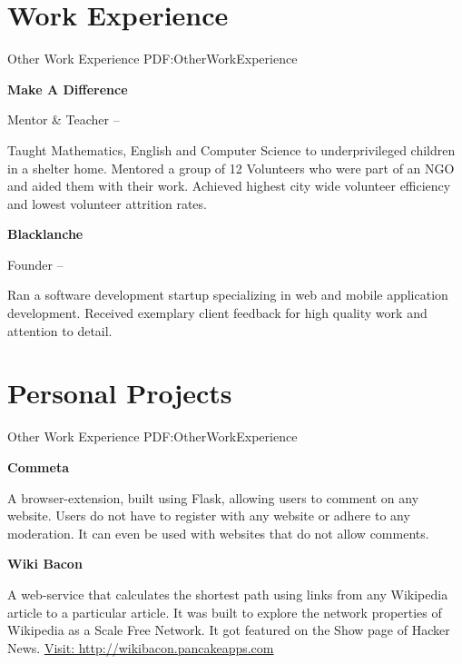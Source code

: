 \documentclass[letterpaper,10pt,oneside]{article}
\begin{document}
\begin{body}

\section
{Work\newline
Experience}
{Other Work Experience}
{PDF:OtherWorkExperience}


{\textbf{Make A Difference}}


\GapNoBreak
\BulletItem
Mentor \& Teacher
\hfill
{} --
\begin{detail}
\SubBulletItem
Taught Mathematics, English and Computer Science to underprivileged children in a shelter home.
\SubBulletItem
Mentored a group of 12 Volunteers who were part of an NGO and aided them with their work.
\SubBulletItem
Achieved highest city wide volunteer efficiency and lowest volunteer attrition rates.
\end{detail}
\BigGap

{\textbf{Blacklanche}}


\GapNoBreak
\BulletItem
Founder
\hfill
{} --
\begin{detail}
\SubBulletItem
Ran a software development startup specializing in web and mobile application development.
\SubBulletItem
Received exemplary client feedback for high quality work and attention to detail.
\end{detail}


\section
{Personal\newline
Projects}
{Other Work Experience}
{PDF:OtherWorkExperience}


{\textbf{Commeta}}
\hfill
{}
\begin{detail}
A browser-extension, built using Flask, allowing users to comment on any website. \newline Users do not have to register with any website or adhere to any moderation. It can even be used with websites that do not allow comments. 
\end{detail}

\GapNoBreak
{\textbf{Wiki Bacon}}
\hfill
{}
\begin{detail}
A web-service that calculates the shortest path using links from any Wikipedia article to a particular article. \newline It was built to explore the network properties of Wikipedia as a Scale Free Network.
\newline
It got featured on the Show page of Hacker News.
\newline
\href{http://wikibacon.pancakeapps.com}{Visit: http://wikibacon.pancakeapps.com}
\end{detail}


\end{body}
\end{document}
